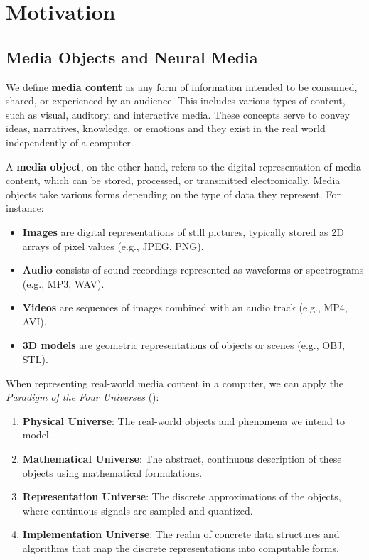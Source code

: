 
\section{Motivation}

\subsection{Media Objects and Neural Media}

We define \textbf{media content} as any form of information intended to be consumed, shared, or experienced by an audience. This includes various types of content, such as visual, auditory, and interactive media. These concepts serve to convey ideas, narratives, knowledge, or emotions and they exist in the real world independently of a computer.

A \textbf{media object}, on the other hand, refers to the digital representation of media content, which can be stored, processed, or transmitted electronically. Media objects take various forms depending on the type of data they represent. For instance:

\begin{itemize}
\item \textbf{Images} are digital representations of still pictures, typically stored as 2D arrays of pixel values (e.g., JPEG, PNG).
\item \textbf{Audio} consists of sound recordings represented as waveforms or spectrograms (e.g., MP3, WAV).
\item \textbf{Videos} are sequences of images combined with an audio track (e.g., MP4, AVI).
\item \textbf{3D models} are geometric representations of objects or scenes (e.g., OBJ, STL).
\end{itemize}

When representing real-world media content in a computer, we can apply the \textit{Paradigm of the Four Universes} (\cite{gomes1995}):

\begin{enumerate}
\item \textbf{Physical Universe}: The real-world objects and phenomena we intend to model.
\item \textbf{Mathematical Universe}: The abstract, continuous description of these objects using mathematical formulations.
\item \textbf{Representation Universe}: The discrete approximations of the objects, where continuous signals are sampled and quantized.
\item \textbf{Implementation Universe}: The realm of concrete data structures and algorithms that map the discrete representations into computable forms.
\end{enumerate}

